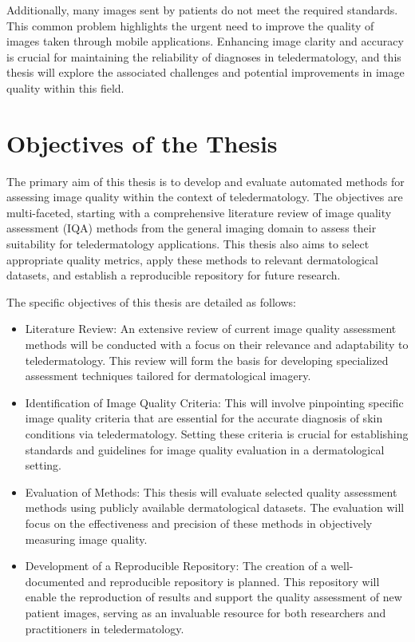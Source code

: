 \vspace{\baselineskip}
Additionally, many images sent by patients do not meet the required standards. This common problem highlights the urgent need to improve the quality of images taken through mobile applications. Enhancing image clarity and accuracy is crucial for maintaining the reliability of diagnoses in teledermatology, and this thesis will explore the associated challenges and potential improvements in image quality within this field.\par 


\section{Objectives of the Thesis}
\label{sec:Objectives}
The primary aim of this thesis is to develop and evaluate automated methods for assessing image quality within the context of teledermatology. The objectives are multi-faceted, starting with a comprehensive literature review of image quality assessment (IQA) methods from the general imaging domain to assess their suitability for teledermatology applications. This thesis also aims to select appropriate quality metrics, apply these methods to relevant dermatological datasets, and establish a reproducible repository for future research. \par
\vspace{\baselineskip}
The specific objectives of this thesis are detailed as follows:
\begin{itemize}
    \item Literature Review: An extensive review of current image quality assessment methods will be conducted with a focus on their relevance and adaptability to teledermatology. This review will form the basis for developing specialized assessment techniques tailored for dermatological imagery.
    \item Identification of Image Quality Criteria: This will involve pinpointing specific image quality criteria that are essential for the accurate diagnosis of skin conditions via teledermatology. Setting these criteria is crucial for establishing standards and guidelines for image quality evaluation in a dermatological setting.
    \item Evaluation of Methods: This thesis will evaluate selected quality assessment methods using publicly available dermatological datasets. The evaluation will focus on the effectiveness and precision of these methods in objectively measuring image quality.
    \item Development of a Reproducible Repository: The creation of a well-documented and reproducible repository is planned. This repository will enable the reproduction of results and support the quality assessment of new patient images, serving as an invaluable resource for both researchers and practitioners in teledermatology.
\end{itemize}
